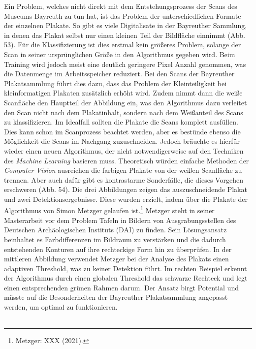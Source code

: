 \documentclass[a4paper,12pt,ngerman]{article}
\begin{document}
Ein Problem, welches nicht direkt mit dem Entstehungsprozess der Scans des Museums Bayreuth zu tun hat, ist das Problem der unterschiedlichen Formate der einzelnen Plakate. So gibt es viele Digitalisate in der Bayreuther Sammlung, in denen das Plakat selbst nur einen kleinen Teil der Bildfläche einnimmt (Abb. 53). Für die Klassifizierung ist dies erstmal kein größeres Problem, solange der Scan in seiner ursprünglichen Größe in den Algorithmus gegeben wird. Beim Training wird jedoch meist eine deutlich geringere Pixel Anzahl genommen, was die Datenmenge im Arbeitsspeicher reduziert. Bei den Scans der Bayreuther Plakatsammlung führt dies dazu, dass das Problem der Kleinteiligkeit bei kleinformatigen Plakaten zusätzlich erhöht wird. Zudem nimmt dann die weiße Scanfläche den Hauptteil der Abbildung ein, was den Algorithmus dazu verleitet den Scan nicht nach dem Plakatinhalt, sondern nach dem Weißanteil des Scans zu klassifizieren. Im Idealfall sollten die Plakate die Scans komplett ausfüllen. Dies kann schon im Scanprozess beachtet werden, aber es bestünde ebenso die Möglichkeit die Scans im Nachgang zuzuschneiden. Jedoch bräuchte es hierfür wieder einen neuen Algorithmus, der nicht notwendigerweise auf den Techniken des \textit{Machine Learning} basieren muss. Theoretisch würden einfache Methoden der \textit{Computer Vision} ausreichen die farbigen Plakate von der weißen Scanfläche zu trennen. Aber auch dafür gibt es kontrastarme Sonderfälle, die dieses Vorgehen erschweren (Abb. 54). Die drei Abbildungen zeigen das auszuschneidende Plakat und zwei Detektionsergebnisse. Diese wurden erzielt, indem über die Plakate der Algorithmus von Simon Metzger gelaufen ist.\footnote{Metzger: XXX (2021).}  Metzger steht in seiner Masterarbeit vor dem Problem Tafeln in Bildern von Ausgrabungsstellen des Deutschen Archäologischen Instituts (DAI) zu finden. Sein Lösungsansatz beinhaltet es Farbdifferenzen im Bildraum zu verstärken und die dadurch entstehenden Konturen auf ihre rechteckige Form hin zu überprüfen. In der mittleren Abbildung verwendet Metzger bei der Analyse des Plakats einen adaptiven Threshold, was zu keiner Detektion führt. Im rechten Beispiel erkennt der Algorithmus durch einen globalen Threshold das schwarze Rechteck und legt einen entsprechenden grünen Rahmen darum. Der Ansatz birgt Potential und müsste auf die Besonderheiten der Bayreuther Plakatsammlung angepasst werden, um optimal zu funktionieren. \\
\\
\end{document}
